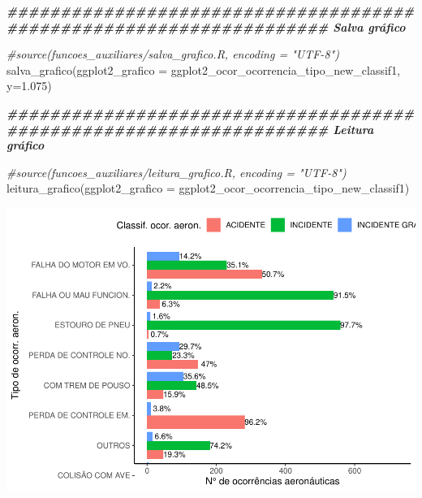 \documentclass[
]{article}
\newenvironment{Shaded}{\begin{snugshade}}{\end{snugshade}}
\newcommand{\AttributeTok}[1]{\textcolor[rgb]{0.77,0.63,0.00}{#1}}
\newcommand{\CommentTok}[1]{\textcolor[rgb]{0.56,0.35,0.01}{\textit{#1}}}
\newcommand{\DocumentationTok}[1]{\textcolor[rgb]{0.56,0.35,0.01}{\textbf{\textit{#1}}}}
\newcommand{\FloatTok}[1]{\textcolor[rgb]{0.00,0.00,0.81}{#1}}
\newcommand{\FunctionTok}[1]{\textcolor[rgb]{0.00,0.00,0.00}{#1}}
\newcommand{\NormalTok}[1]{#1}
\begin{document}
\begin{Shaded}
\begin{Highlighting}[]
\DocumentationTok{\#\#\#\#\#\#\#\#\#\#\#\#\#\#\#\#\#\#\#\#\#\#\#\#\#\#\#\#\#\#\#\#\#\#\#\#\#\#\#\#\#\#\#\#\#\#\#\#\#\#\#\#\#\#\#\#\#\#\#\#\#\#\#\#\#\#\#\# Salva gráfico}

\CommentTok{\#source(\textquotesingle{}funcoes\_auxiliares/salva\_grafico.R\textquotesingle{}, encoding = "UTF{-}8")}
\FunctionTok{salva\_grafico}\NormalTok{(}\AttributeTok{ggplot2\_grafico =}\NormalTok{ ggplot2\_ocor\_ocorrencia\_tipo\_new\_classif1, }\AttributeTok{y=}\FloatTok{1.075}\NormalTok{)}

\DocumentationTok{\#\#\#\#\#\#\#\#\#\#\#\#\#\#\#\#\#\#\#\#\#\#\#\#\#\#\#\#\#\#\#\#\#\#\#\#\#\#\#\#\#\#\#\#\#\#\#\#\#\#\#\#\#\#\#\#\#\#\#\#\#\#\#\#\#\#\#\# Leitura gráfico}

\CommentTok{\#source(\textquotesingle{}funcoes\_auxiliares/leitura\_grafico.R\textquotesingle{}, encoding = "UTF{-}8")}
\FunctionTok{leitura\_grafico}\NormalTok{(}\AttributeTok{ggplot2\_grafico =}\NormalTok{ ggplot2\_ocor\_ocorrencia\_tipo\_new\_classif1)}
\end{Highlighting}
\end{Shaded}

\begin{center}\includegraphics{4.Relatorio/pdf/index_files/figure-latex/unnamed-chunk-45-1} \end{center}
\end{document}
